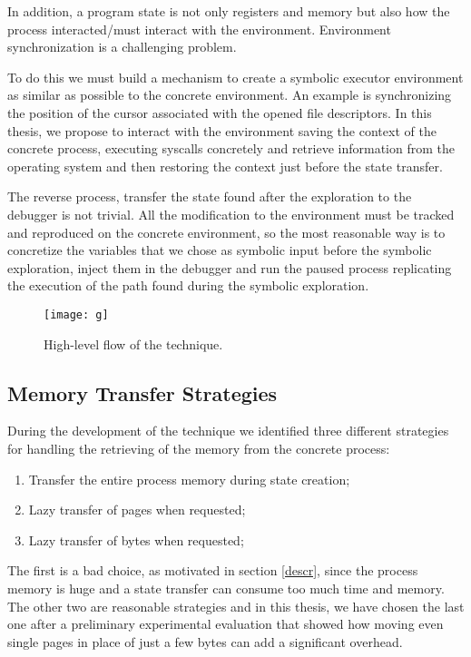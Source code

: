 In addition, a program state is not only registers and memory but also how the process interacted/must interact with the environment.
Environment synchronization is a challenging problem.

To do this we must build a mechanism to create a symbolic executor environment as similar as possible to the concrete environment. An example is synchronizing the position of the cursor associated with the opened file descriptors. In this thesis, we propose to interact with the environment saving the context of the concrete process, executing syscalls concretely and retrieve information from the operating system and then restoring the context just before the state transfer.

The reverse process, transfer the state found after the exploration to the debugger is not trivial. All the modification to the environment must be tracked and reproduced on the concrete environment, so the most reasonable way is to concretize the variables that we chose as symbolic input before the symbolic exploration, inject them in the debugger and run the paused process replicating the execution of the path found during the symbolic exploration.

\begin{figure}[H]
  \caption{High-level flow of the technique.}
  \centering
  \texttt{[image: g]}
  \label{fig:g}
\end{figure}

\subsection{Memory Transfer Strategies}

During the development of the technique we identified three different strategies for handling the retrieving of the memory from the concrete process:

\begin{enumerate}  
\item Transfer the entire process memory during state creation;
\item Lazy transfer of pages when requested;
\item Lazy transfer of bytes when requested;
\end{enumerate}

The first is a bad choice, as motivated in section \ref{descr}, since the process memory is huge and a state transfer can consume too much time and memory.
The other two are reasonable strategies and in this thesis, we have chosen the last one after a preliminary experimental evaluation that showed how moving even single pages in place of just a few bytes can add a significant overhead.

